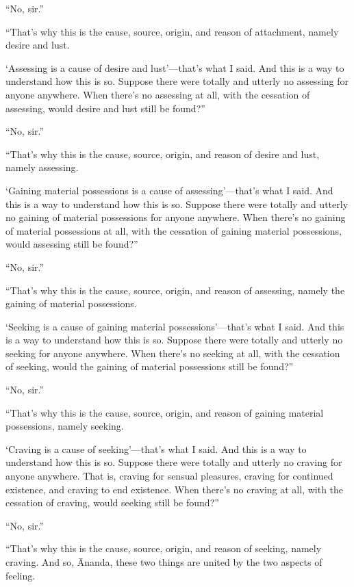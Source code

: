 \documentclass[12pt,openany]{book}%
\begin{document}
“No, sir.” 

“That’s why this is the cause, source, origin, and reason of attachment, namely desire and lust. 

‘Assessing is a cause of desire and lust’—that’s what I said. And this is a way to understand how this is so. Suppose there were totally and utterly no assessing for anyone anywhere. When there’s no assessing at all, with the cessation of assessing, would desire and lust still be found?” 

“No, sir.” 

“That’s why this is the cause, source, origin, and reason of desire and lust, namely assessing. 

‘Gaining material possessions is a cause of assessing’—that’s what I said. And this is a way to understand how this is so. Suppose there were totally and utterly no gaining of material possessions for anyone anywhere. When there’s no gaining of material possessions at all, with the cessation of gaining material possessions, would assessing still be found?” 

“No, sir.” 

“That’s why this is the cause, source, origin, and reason of assessing, namely the gaining of material possessions. 

‘Seeking is a cause of gaining material possessions’—that’s what I said. And this is a way to understand how this is so. Suppose there were totally and utterly no seeking for anyone anywhere. When there’s no seeking at all, with the cessation of seeking, would the gaining of material possessions still be found?” 

“No, sir.” 

“That’s why this is the cause, source, origin, and reason of gaining material possessions, namely seeking. 

‘Craving is a cause of seeking’—that’s what I said. And this is a way to understand how this is so. Suppose there were totally and utterly no craving for anyone anywhere. That is, craving for sensual pleasures, craving for continued existence, and craving to end existence. When there’s no craving at all, with the cessation of craving, would seeking still be found?” 

“No, sir.” 

“That’s why this is the cause, source, origin, and reason of seeking, namely craving. And so, Ānanda, these two things are united by the two aspects of feeling. 
\end{document}
